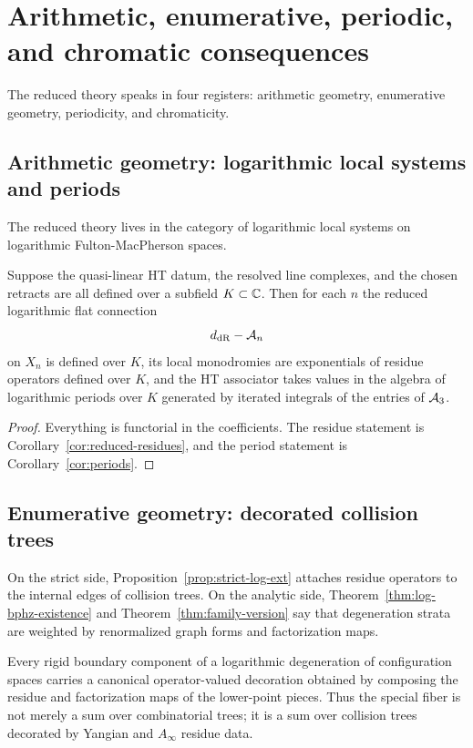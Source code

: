 \section{Arithmetic, enumerative, periodic, and chromatic consequences}\label{sec:consequences}

The reduced theory speaks in four registers: arithmetic geometry, enumerative geometry, periodicity, and chromaticity.

\subsection{Arithmetic geometry: logarithmic local systems and periods}
The reduced theory lives in the category of logarithmic local systems on logarithmic Fulton-MacPherson spaces.

\begin{proposition}\label{prop:arithmetic-form}
Suppose the quasi-linear HT datum, the resolved line complexes, and the chosen retracts are all defined over a subfield $K\subset\mathbb C$. Then for each $n$ the reduced logarithmic flat connection
\[
 d_{\mathrm{dR}}-\mathcal A_n
\]
on $X_n$ is defined over $K$, its local monodromies are exponentials of residue operators defined over $K$, and the HT associator takes values in the algebra of logarithmic periods over $K$ generated by iterated integrals of the entries of $\mathcal A_3$.
\end{proposition}

\begin{proof}
Everything is functorial in the coefficients. The residue statement is Corollary~\ref{cor:reduced-residues}, and the period statement is Corollary~\ref{cor:periods}.
\end{proof}

\subsection{Enumerative geometry: decorated collision trees}
On the strict side, Proposition~\ref{prop:strict-log-ext} attaches residue operators to the internal edges of collision trees. On the analytic side, Theorem~\ref{thm:log-bphz-existence} and Theorem~\ref{thm:family-version} say that degeneration strata are weighted by renormalized graph forms and factorization maps.

\begin{proposition}\label{prop:decorated-degeneration}
Every rigid boundary component of a logarithmic degeneration of configuration spaces carries a canonical operator-valued decoration obtained by composing the residue and factorization maps of the lower-point pieces. Thus the special fiber is not merely a sum over combinatorial trees; it is a sum over collision trees decorated by Yangian and $A_\infty$ residue data.
\end{proposition}

